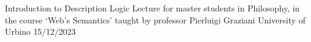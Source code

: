 \begin{cvhonors}
 \cvhonor
   {Introduction to Description Logic} %
 {Lecture for master students in Philosophy, in the course ‘Web's Semantics’ taught by professor Pierluigi Graziani} %
  {University of Urbino} %
  {15/12/2023} %







\end{cvhonors}
